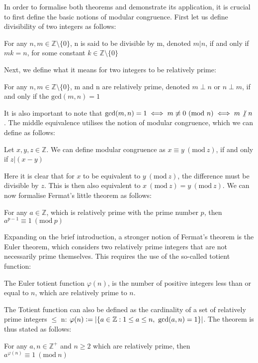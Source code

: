 In order to formalise both theorems and demonstrate its application, it is crucial to first define the basic notions of modular congruence. First let us define divisibility of two integers as follows:
\begin{definition}
For any $n, m \in \mathbb{Z} \setminus \{ 0\}$, n is said to be divisible by m, denoted $m | n$, if and only if $mk = n$, for some constant $k \in \mathbb{Z} \setminus \{ 0\}$
\end{definition}
Next, we define what it means for two integers to be relatively prime:
\begin{definition}
For any $n, m \in \mathbb{Z} \setminus \{ 0\}$, m and n are relatively prime, denoted $m \perp n$ or $n \perp m$, if and only if the $\text{gcd}(m, n) = 1$
\end{definition}
It is also important to note that $\text{gcd}(m, n) = 1 \iff m \not \equiv 0~(\text{mod}~n) \\ \iff m \not|~n$. The middle equivalence utilises the notion of modular congruence, which we can define as follows:
\begin{definition}
Let $x, y, z \in \mathbb{Z}$. We can define modular congruence as $x \equiv y~(\text{mod}~z)$, if and only if $z | (x - y)$
\end{definition}
Here it is clear that for $x$ to be equivalent to $y~(\text{mod}~z)$, the difference must be divisible by $z$. This is then also equivalent to $x~(\text{mod}~z) = y~(\text{mod}~z)$. We can now formalise Fermat's little theorem as follows:
\begin{theorem}
\label{fermat_thrm}
For any $a \in \mathbb{Z}$, which is relatively prime with the prime number $p$, then $a^{p - 1} \equiv 1~(\text{mod}~p)$
\end{theorem}
Expanding on the brief introduction, a stronger notion of Fermat's theorem is the Euler theorem, which considers two relatively prime integers that are not necessarily prime themselves. This requires the use of the so-called totient function:
\begin{definition}
The Euler totient function $\varphi(n)$, is the number of positive integers less than or equal to $n$, which are relatively prime to $n$.
\end{definition}
The Totient function can also be defined as the cardinality of a set of relatively prime integers $\leq$ n: $\varphi(n) \vcentcolon= \left| \left\{ a \in \mathbb{Z} : 1 \leq a \leq n, ~\text{gcd}(a,n) = 1 \right\} \right|$. The theorem is thus stated as follows:
\begin{theorem}
\label{euler_thrm}
For any $a, n \in \mathbb{Z}^{+}$ and $n \geq 2$ which are relatively prime, then $a^{\varphi(n)} \equiv 1~(\text{mod}~n)$
\end{theorem}
